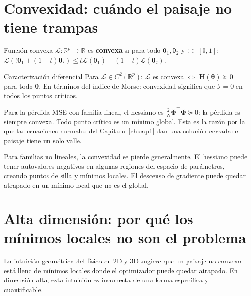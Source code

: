\section{Convexidad: cuándo el paisaje no tiene trampas}
\label{sec:convexidad}


\begin{definicion}{Función convexa}
\label{def:convexa}
$\mathcal{L}: \mathbb{R}^p \to \mathbb{R}$ es \textbf{convexa} si para
todo $\bm{\theta}_1, \bm{\theta}_2$ y $t \in [0,1]$:
$\mathcal{L}(t\bm{\theta}_1+(1-t)\bm{\theta}_2) \leq
t\mathcal{L}(\bm{\theta}_1)+(1-t)\mathcal{L}(\bm{\theta}_2)$.
\end{definicion}

\begin{proposicion}{Caracterización diferencial}
\label{prop:conv_hessiano}
Para $\mathcal{L} \in C^2(\mathbb{R}^p)$: $\mathcal{L}$ es convexa
$\Leftrightarrow$ $\bm{H}(\bm{\theta}) \succeq 0$ para todo
$\bm{\theta}$. En términos del índice de Morse: convexidad significa
que $\mathcal{I} = 0$ en todos los puntos críticos.
\end{proposicion}

Para la pérdida MSE con familia lineal, el hessiano es
$\frac{2}{N}\bm{\Phi}^\top\bm{\Phi} \succeq 0$: la pérdida es siempre
convexa. Todo punto crítico es un mínimo global. Esta es la razón por
la que las ecuaciones normales del Capítulo~\ref{ch:cap1} dan una
solución cerrada: el paisaje tiene un solo valle.

Para familias no lineales, la convexidad se pierde generalmente.
El hessiano puede tener autovalores negativos en algunas regiones del
espacio de parámetros, creando puntos de silla y mínimos locales. El
descenso de gradiente puede quedar atrapado en un mínimo local que no
es el global.

\section{Alta dimensión: por qué los mínimos locales no son el problema}
\label{sec:alta_dim}


La intuición geométrica del físico en 2D y 3D sugiere que un paisaje
no convexo está lleno de mínimos locales donde el optimizador puede
quedar atrapado. En dimensión alta, esta intuición es incorrecta de
una forma específica y cuantificable.

